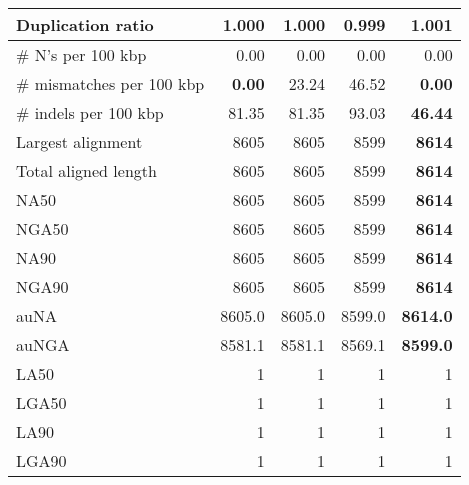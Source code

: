 \documentclass[12pt,a4paper]{article}
\begin{document}
\begin{table}[ht]
\begin{center}
\begin{tabular}{|l*{4}{|r}|}
Duplication ratio & 1.000 & 1.000 & {\bf 0.999} & 1.001 \\ \hline
\# N's per 100 kbp & 0.00 & 0.00 & 0.00 & 0.00 \\ \hline
\# mismatches per 100 kbp & {\bf 0.00} & 23.24 & 46.52 & {\bf 0.00} \\ \hline
\# indels per 100 kbp & 81.35 & 81.35 & 93.03 & {\bf 46.44} \\ \hline
Largest alignment & 8605 & 8605 & 8599 & {\bf 8614} \\ \hline
Total aligned length & 8605 & 8605 & 8599 & {\bf 8614} \\ \hline
NA50 & 8605 & 8605 & 8599 & {\bf 8614} \\ \hline
NGA50 & 8605 & 8605 & 8599 & {\bf 8614} \\ \hline
NA90 & 8605 & 8605 & 8599 & {\bf 8614} \\ \hline
NGA90 & 8605 & 8605 & 8599 & {\bf 8614} \\ \hline
auNA & 8605.0 & 8605.0 & 8599.0 & {\bf 8614.0} \\ \hline
auNGA & 8581.1 & 8581.1 & 8569.1 & {\bf 8599.0} \\ \hline
LA50 & 1 & 1 & 1 & 1 \\ \hline
LGA50 & 1 & 1 & 1 & 1 \\ \hline
LA90 & 1 & 1 & 1 & 1 \\ \hline
LGA90 & 1 & 1 & 1 & 1 \\ \hline
\end{tabular}
\end{center}
\end{table}
\end{document}
